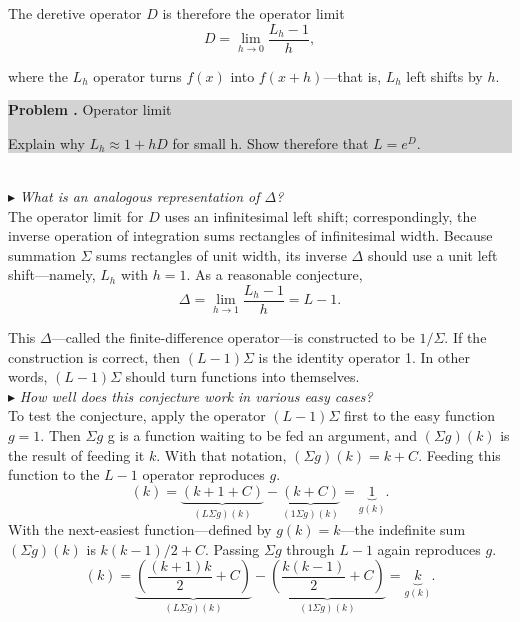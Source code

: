 \documentclass[fleqn]{book}
\newcounter{problem1}
\newcommand{\problem}{\par\addtocounter{problem1}{1}%
\textbf{Problem \arabic{chapter}.\arabic{problem1} }\quad}
\begin{document}
\noindent The deretive operator $D$ is therefore the operator limit
\begin{equation}
D=\lim_{h\rightarrow 0}\frac{L_h-1}{h}, 
\end{equation}

where the $L_h$ operator turns $f(x)$ into $f(x+h)$---that is, $L_h$ left  shifts by $h$.\\

\colorbox{lightgray}{
\begin{minipage}{\textwidth}
\hangindent=3cm \large{{\bf \problem Operator limit}}
\vspace{0.1cm}

\large{Explain why $L_h\approx1+hD$ for small h. Show therefore that $L=e^D$}.
\end{minipage}}\\

\noindent \large $\blacktriangleright$ \textit{What is an analogous representation of $\Delta$?} \\

\Large \noindent The operator limit for $D$ uses an infinitesimal left shift; correspondingly,
the inverse operation of integration sums rectangles of infinitesimal width.
Because summation $\Sigma$ sums rectangles of unit width, its inverse $\Delta$ should
use a unit left shift—namely, $L_h$ with $h = 1$. As a reasonable conjecture,
\begin{equation}
\Delta=\lim_{h\rightarrow 1}\frac{L_h-1}{h}=L-1. 
\end{equation}

\noindent This $\Delta$---called the finite-difference operator—is constructed to be $1/\Sigma$. If the construction is correct, then $(L-1)\Sigma$ is the identity operator 1. In other words, $(L-1)\Sigma$ should turn functions into themselves.\\

\noindent \large $\blacktriangleright$ \textit{How well does this conjecture work in various easy cases?} \\

\Large \noindent To test the conjecture, apply the operator $(L-1)\Sigma$ first to the easy function $g = 1$. Then $\Sigma g$ g is a function waiting to be fed an argument, and $(\Sigma g)(k)$ is the result of feeding it $k$. With that notation, $(\Sigma g)(k)=k+C$. Feeding
this function to the $L−1$ operator reproduces $g$.
\begin{equation}
[(L-1)\Sigma g](k)=\underbrace{(k+1+C)}_{(L\Sigma g)(k)}-\underbrace{(k+C)}_{(1\Sigma g)(k)}=\underbrace{1}_{g(k)}.
\end{equation} \vspace{0.001cm}
With the next-easiest function—defined by $g(k)=k$---the indefinite sum $(\Sigma g)(k)$ is $k(k-1)/2+C$. Passing $\Sigma g$ through $L-1$ again reproduces $g$.
\begin{equation}
[(L-1)\Sigma g](k)=\underbrace{(\frac{(k+1)k}{2}+C)}_{(L\Sigma g)(k)}-\underbrace{(\frac{k(k-1)}{2}+C)}_{(1\Sigma g)(k)}=\underbrace{k}_{g(k)}. 
\end{equation} 
\end{document}
